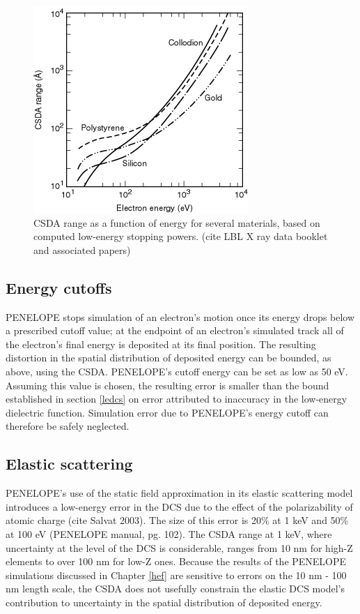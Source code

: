 \documentclass [11pt, proquest, article] {uwthesis}[2016/11/22]
\begin{document}
\begin{figure}[h] 
\caption{CSDA range as a function of energy for several materials, based on computed low-energy stopping powers. (cite LBL X ray data booklet and associated papers)}
\label{fig:csda}
\centering
\includegraphics[scale=0.7]{../Figures/csda.png}
\end{figure}

\subsection{Energy cutoffs} \label{cutoffs}
PENELOPE stops simulation of an electron's motion once its energy drops below a prescribed cutoff value; at the endpoint of an electron's simulated track all of the electron's final energy is deposited at its final position. The resulting distortion in the spatial distribution of deposited energy can be bounded, as above, using the CSDA. PENELOPE's cutoff energy can be set as low as 50 eV. Assuming this value is chosen, the resulting error is smaller than the bound established in section \ref{ledcs} on error attributed to inaccuracy in the low-energy dielectric function. Simulation error due to PENELOPE's energy cutoff can therefore be safely neglected.

\subsection{Elastic scattering}
PENELOPE's use of the static field approximation in its elastic scattering model introduces a low-energy error in the DCS due to the effect of the polarizability of atomic charge (cite Salvat 2003). The size of this error is 20\% at 1 keV and 50\% at 100 eV (PENELOPE manual, pg. 102). The CSDA range at 1 keV, where uncertainty at the level of the DCS is considerable, ranges from 10 nm for high-Z elements to over 100 nm for low-Z ones. Because the results of the PENELOPE simulations discussed in Chapter \ref{hef}  are sensitive to errors on the 10 nm - 100 nm length scale, the CSDA does not usefully constrain the elastic DCS model's contribution to uncertainty in the spatial distribution of deposited energy. 
\end{document}
